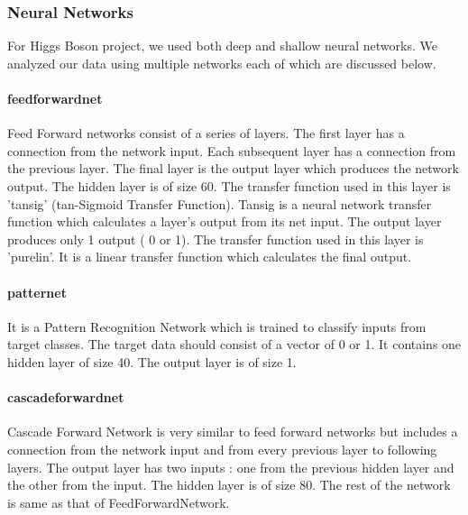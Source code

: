 \subsubsection{Neural Networks}

For Higgs Boson project, we used both deep and shallow neural networks. We analyzed our data using multiple networks each of which are discussed below. 


\paragraph{feedforwardnet} Feed Forward networks consist of a series of layers. The first layer has a connection from the network input. Each subsequent layer has a connection from the previous layer. The final layer is the output layer which produces the network output. 
The hidden layer is of size 60. The transfer function used in this layer is 'tansig' (tan-Sigmoid Transfer Function). Tansig is a neural network transfer function which calculates a layer's output from its net input. The output layer produces only 1 output ( 0 or 1). The transfer function used in this layer is 'purelin'. It is a linear transfer function which calculates the final output.


\paragraph{patternet} It is a Pattern Recognition Network which is trained to classify inputs from target classes. The target data should consist of a vector of 0 or 1. It contains one hidden layer of size 40. The output layer is of size 1.


\paragraph{cascadeforwardnet}  Cascade Forward Network is very similar to feed forward networks but includes a connection from the network input and from every previous layer to following layers. The output layer has two inputs : one from the previous hidden layer and the other from the input. The hidden layer is of size 80. The rest of the network is same as that of FeedForwardNetwork.  


